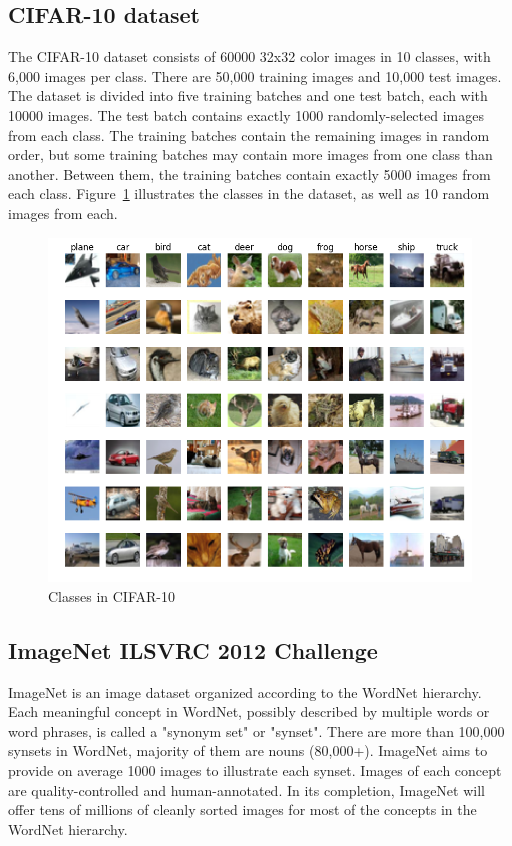 \subsection{CIFAR-10 dataset}
The CIFAR-10 dataset consists of 60000 32x32 color images in 10 classes, with 
6,000 images per class. There are 50,000 training images and 10,000 test images.
The dataset is divided into five training batches and one test batch, each with 
10000 images. The test batch contains exactly 1000 randomly-selected images from 
each class. The training batches contain the remaining images in random order, 
but some training batches may contain more images from one class than another. 
Between them, the training batches contain exactly 5000 images from each class.
Figure~\ref{fig:cifar10} illustrates the classes in the dataset, as well as 10 
random images from each.
\begin{figure}[H]
    \centerline{\includegraphics[scale=0.40]{methodology/figs/cifar10.png}}
    \caption{Classes in CIFAR-10}
    \label{fig:cifar10}
\end{figure}

\subsection{ImageNet ILSVRC 2012 Challenge}
ImageNet is an image dataset organized according to the WordNet hierarchy. Each 
meaningful concept in WordNet, possibly described by multiple words or word 
phrases, is called a "synonym set" or "synset". There are more than 100,000 
synsets in WordNet, majority of them are nouns (80,000+). ImageNet aims to 
provide on average 1000 images to illustrate each synset. Images of each concept 
are quality-controlled and human-annotated. In its completion, ImageNet will 
offer tens of millions of cleanly sorted images for most of the concepts in 
the WordNet hierarchy.

